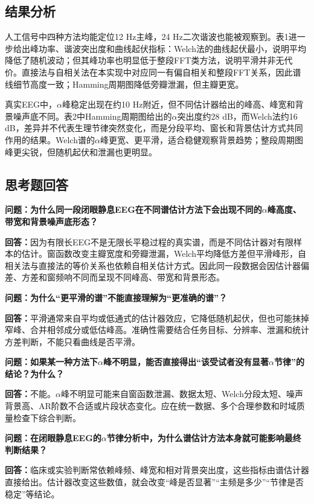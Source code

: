 \documentclass[UTF8,zihao=-4,fontset=windows]{ctexart}
\begin{document}
\subsection{结果分析}
人工信号中四种方法均能定位12 Hz主峰，24 Hz二次谐波也能被观察到。表1进一步给出峰功率、谐波突出度和曲线起伏指标：Welch法的曲线起伏最小，说明平均降低了随机波动；但其峰功率也明显低于整段FFT类方法，说明平滑并非无代价。直接法与自相关法在本实现中对应同一有偏自相关和整段FFT关系，因此谱线细节高度一致；Hamming周期图降低旁瓣泄漏，但主瓣更宽。

真实EEG中，$\alpha$峰稳定出现在约10 Hz附近，但不同估计器给出的峰高、峰宽和背景噪声底不同。表2中Hamming周期图给出的$\alpha$突出度约28 dB，而Welch法约16 dB，差异并不代表生理节律突然变化，而是分段平均、窗长和背景估计方式共同作用的结果。Welch谱的$\alpha$峰更宽、更平滑，适合稳健观察背景趋势；整段周期图峰更尖锐，但随机起伏和泄漏也更明显。

\subsection{思考题回答}
\textbf{问题：为什么同一段闭眼静息EEG在不同谱估计方法下会出现不同的$\alpha$峰高度、带宽和背景噪声底形态？}

\textbf{回答：}因为有限长EEG不是无限长平稳过程的真实谱，而是不同估计器对有限样本的估计。窗函数改变主瓣宽度和旁瓣泄漏，Welch平均降低方差但平滑峰形，自相关法与直接法的等价关系也依赖自相关估计方式。因此同一段数据会因估计器偏差、方差和窗频响不同而呈现不同峰高、带宽和背景形态。

\textbf{问题：为什么“更平滑的谱”不能直接理解为“更准确的谱”？}

\textbf{回答：}平滑通常来自平均或低通式的估计器效应，它降低随机起伏，但也可能抹掉窄峰、合并相邻成分或低估峰高。准确性需要结合任务目标、分辨率、泄漏和统计方差判断，不能只看曲线是否平滑。

\textbf{问题：如果某一种方法下$\alpha$峰不明显，能否直接得出“该受试者没有显著$\alpha$节律”的结论？为什么？}

\textbf{回答：}不能。$\alpha$峰不明显可能来自窗函数泄漏、数据太短、Welch分段太短、噪声背景高、AR阶数不合适或片段状态变化。应在统一数据、多个合理参数和时域质量检查下综合判断。

\textbf{问题：在闭眼静息EEG的$\alpha$节律分析中，为什么谱估计方法本身就可能影响最终判断结果？}

\textbf{回答：}临床或实验判断常依赖峰频、峰宽和相对背景突出度，这些指标由谱估计器直接给出。估计器改变这些数值，就会改变“峰是否显著”“主频是多少”“节律是否稳定”等结论。
\end{document}
